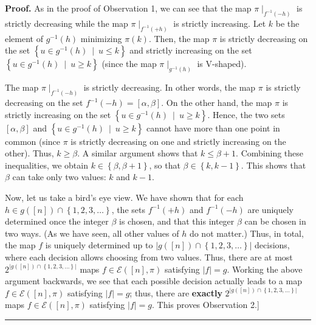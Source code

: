 \documentclass[numbers=enddot,12pt,final,onecolumn,notitlepage]{scrartcl}%
\theoremstyle{definition}
\newenvironment{proof}[1][Proof]{\noindent\textbf{#1.} }{\ \rule{0.5em}{0.5em}}
\newenvironment{vershort}{}{}
\begin{document}
\begin{vershort}
\begin{proof}
As in the proof of Observation 1, we can see that the map $\pi\mid
_{f^{-1}\left(  -h\right)  }$ is strictly decreasing while the map $\pi
\mid_{f^{-1}\left(  +h\right)  }$ is strictly increasing. Let $k$ be the
element of $g^{-1}\left(  h\right)  $ minimizing $\pi\left(  k\right)  $.
Then, the map $\pi$ is strictly decreasing on the set $\left\{  u\in
g^{-1}\left(  h\right)  \ \mid\ u\leq k\right\}  $ and strictly increasing on
the set $\left\{  u\in g^{-1}\left(  h\right)  \ \mid\ u\geq k\right\}  $
(since the map $\pi\mid_{g^{-1}\left(  h\right)  }$ is V-shaped).

The map $\pi\mid_{f^{-1}\left(  -h\right)  }$ is strictly decreasing. In other
words, the map $\pi$ is strictly decreasing on the set $f^{-1}\left(
-h\right)  =\left[  \alpha,\beta\right]  $. On the other hand, the map $\pi$
is strictly increasing on the set $\left\{  u\in g^{-1}\left(  h\right)
\ \mid\ u\geq k\right\}  $. Hence, the two sets $\left[  \alpha,\beta\right]
$ and $\left\{  u\in g^{-1}\left(  h\right)  \ \mid\ u\geq k\right\}  $ cannot
have more than one point in common (since $\pi$ is strictly decreasing on one
and strictly increasing on the other). Thus, $k\geq\beta$. A similar argument
shows that $k\leq\beta+1$. Combining these inequalities, we obtain
$k\in\left\{  \beta,\beta+1\right\}  $, so that $\beta\in\left\{
k,k-1\right\}  $. This shows that $\beta$ can take only two values: $k$ and
$k-1$.

Now, let us take a bird's eye view. We have shown that for each $h\in g\left(
\left[  n\right]  \right)  \cap\left\{  1,2,3,\ldots\right\}  $, the sets
$f^{-1}\left(  +h\right)  $ and $f^{-1}\left(  -h\right)  $ are uniquely
determined once the integer $\beta$ is chosen, and that this integer $\beta$
can be chosen in two ways. (As we have seen, all other values of $h$ do not
matter.) Thus, in total, the map $f$ is uniquely determined up to $\left\vert
g\left(  \left[  n\right]  \right)  \cap\left\{  1,2,3,\ldots\right\}
\right\vert $ decisions, where each decision allows choosing from two values.
Thus, there are at most $2^{\left\vert g\left(  \left[  n\right]  \right)
\cap\left\{  1,2,3,\ldots\right\}  \right\vert }$ maps $f\in\mathcal{E}\left(
\left[  n\right]  ,\pi\right)  $ satisfying $\left\vert f\right\vert =g$.
Working the above argument backwards, we see that each possible decision
actually leads to a map $f\in\mathcal{E}\left(  \left[  n\right]  ,\pi\right)
$ satisfying $\left\vert f\right\vert =g$; thus, there are \textbf{exactly}
$2^{\left\vert g\left(  \left[  n\right]  \right)  \cap\left\{  1,2,3,\ldots
\right\}  \right\vert }$ maps $f\in\mathcal{E}\left(  \left[  n\right]
,\pi\right)  $ satisfying $\left\vert f\right\vert =g$. This proves
Observation 2.]
\end{proof}
\end{vershort}
\end{document}
